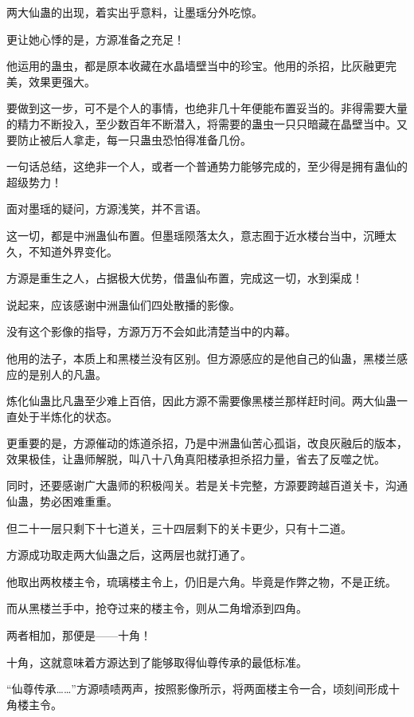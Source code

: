
\begin{this_body}

两大仙蛊的出现，着实出乎意料，让墨瑶分外吃惊。

更让她心悸的是，方源准备之充足！

他运用的蛊虫，都是原本收藏在水晶墙壁当中的珍宝。他用的杀招，比灰融更完美，效果更强大。

要做到这一步，可不是个人的事情，也绝非几十年便能布置妥当的。非得需要大量的精力不断投入，至少数百年不断潜入，将需要的蛊虫一只只暗藏在晶壁当中。又要防止被后人拿走，每一只蛊虫恐怕得准备几份。

一句话总结，这绝非一个人，或者一个普通势力能够完成的，至少得是拥有蛊仙的超级势力！

面对墨瑶的疑问，方源浅笑，并不言语。

这一切，都是中洲蛊仙布置。但墨瑶陨落太久，意志囿于近水楼台当中，沉睡太久，不知道外界变化。

方源是重生之人，占据极大优势，借蛊仙布置，完成这一切，水到渠成！

说起来，应该感谢中洲蛊仙们四处散播的影像。

没有这个影像的指导，方源万万不会如此清楚当中的内幕。

他用的法子，本质上和黑楼兰没有区别。但方源感应的是他自己的仙蛊，黑楼兰感应的是别人的凡蛊。

炼化仙蛊比凡蛊至少难上百倍，因此方源不需要像黑楼兰那样赶时间。两大仙蛊一直处于半炼化的状态。

更重要的是，方源催动的炼道杀招，乃是中洲蛊仙苦心孤诣，改良灰融后的版本，效果极佳，让蛊师解脱，叫八十八角真阳楼承担杀招力量，省去了反噬之忧。

同时，还要感谢广大蛊师的积极闯关。若是关卡完整，方源要跨越百道关卡，沟通仙蛊，势必困难重重。

但二十一层只剩下十七道关，三十四层剩下的关卡更少，只有十二道。

方源成功取走两大仙蛊之后，这两层也就打通了。

他取出两枚楼主令，琉璃楼主令上，仍旧是六角。毕竟是作弊之物，不是正统。

而从黑楼兰手中，抢夺过来的楼主令，则从二角增添到四角。

两者相加，那便是——十角！

十角，这就意味着方源达到了能够取得仙尊传承的最低标准。

“仙尊传承……”方源啧啧两声，按照影像所示，将两面楼主令一合，顷刻间形成十角楼主令。


\end{this_body}
